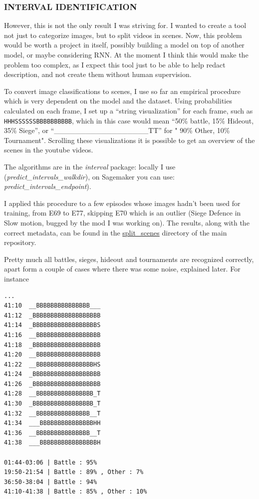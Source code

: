 \documentclass[
]{article}
\begin{document}
\hypertarget{interval-identification}{%
\subsubsection{INTERVAL IDENTIFICATION}\label{interval-identification}}

However, this is not the only result I was striving for. I wanted to
create a tool not just to categorize images, but to split videos in
scenes. Now, this problem would be worth a project in itself, possibly
building a model on top of another model, or maybe considering RNN. At
the moment I think this would make the problem too complex, as I expect
this tool just to be able to help redact description, and not create
them without human supervision.

To convert image classifications to scenes, I use so far an empirical
procedure which is very dependent on the model and the dataset. Using
probabilities calculated on each frame, I set up a ``string
visualization'' for each frame, such as \texttt{HHHSSSSSSBBBBBBBBBB},
which in this case would mean ``50\% battle, 15\% Hideout, 35\% Siege'',
or ``\_\_\_\_\_\_\_\_\_\_\_\_\_\_\_\_\_\_TT'' for " 90\% Other, 10\%
Tournament". Scrolling these visualizations it is possible to get an
overview of the scenes in the youtube videos.

The algorithms are in the \emph{interval} package: locally I use
(\emph{predict\_intervals\_walkdir}), on Sagemaker you can use:
\emph{predict\_intervals\_endpoint}).

I applied this procedure to a few episodes whose images hadn't been used
for training, from E69 to E77, skipping E70 which is an outlier (Siege
Defence in Slow motion, bugged by the mod I was working on). The
results, along with the correct metadata, can be found in the
\url{split_scenes} directory of the main repository.

Pretty much all battles, sieges, hideout and tournaments are recognized
correctly, apart form a couple of cases where there was some noise,
explained later. For instance

\begin{verbatim}
...
41:10  __BBBBBBBBBBBBBBB___
41:12  _BBBBBBBBBBBBBBBBBBB
41:14  _BBBBBBBBBBBBBBBBBBS
41:16  __BBBBBBBBBBBBBBBBBB
41:18  _BBBBBBBBBBBBBBBBBBB
41:20  __BBBBBBBBBBBBBBBBBB
41:22  __BBBBBBBBBBBBBBBBHS
41:24  _BBBBBBBBBBBBBBBBBBB
41:26  _BBBBBBBBBBBBBBBBBBB
41:28  __BBBBBBBBBBBBBBBB_T
41:30  _BBBBBBBBBBBBBBBBB_T
41:32  __BBBBBBBBBBBBBBB__T
41:34  ___BBBBBBBBBBBBBBBHH
41:36  __BBBBBBBBBBBBBBB__T
41:38  ___BBBBBBBBBBBBBBBBH

01:44-03:06 | Battle : 95%
19:50-21:54 | Battle : 89% , Other : 7%
36:50-38:04 | Battle : 94%
41:10-41:38 | Battle : 85% , Other : 10% 
\end{verbatim}
\end{document}
